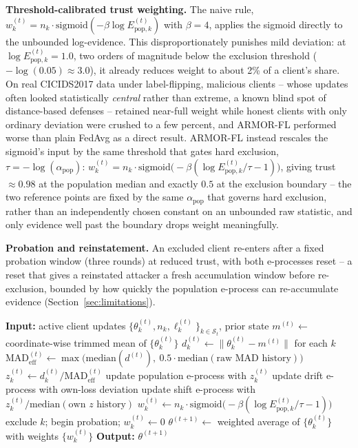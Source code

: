 \documentclass[pdflatex,iicol,sn-mathphys-num]{sn-jnl}%
\theoremstyle{thmstyleone}%
\theoremstyle{thmstyletwo}%
\theoremstyle{thmstylethree}%
\begin{document}
\textbf{Threshold-calibrated trust weighting.} The naive rule, $w_k^{(t)} = n_k \cdot \mathrm{sigmoid}(-\beta \log E_{\mathrm{pop},k}^{(t)})$ with $\beta=4$, applies the sigmoid directly to the unbounded log-evidence. This disproportionately punishes mild deviation: at $\log E_{\mathrm{pop},k}^{(t)} = 1.0$, two orders of magnitude below the exclusion threshold ($-\log(0.05) \approx 3.0$), it already reduces weight to about 2\% of a client's share. On real CICIDS2017 data under label-flipping, malicious clients -- whose updates often looked statistically \emph{central} rather than extreme, a known blind spot of distance-based defenses -- retained near-full weight while honest clients with only ordinary deviation were crushed to a few percent, and ARMOR-FL performed worse than plain FedAvg as a direct result. ARMOR-FL instead rescales the sigmoid's input by the same threshold that gates hard exclusion, $\tau = -\log(\alpha_{\mathrm{pop}})$: $w_k^{(t)} = n_k \cdot \mathrm{sigmoid}\bigl(-\beta (\log E_{\mathrm{pop},k}^{(t)} / \tau - 1)\bigr)$, giving trust $\approx 0.98$ at the population median and exactly $0.5$ at the exclusion boundary -- the two reference points are fixed by the same $\alpha_{\mathrm{pop}}$ that governs hard exclusion, rather than an independently chosen constant on an unbounded raw statistic, and only evidence well past the boundary drops weight meaningfully.

\textbf{Probation and reinstatement.} An excluded client re-enters after a fixed probation window (three rounds) at reduced trust, with both e-processes reset -- a reset that gives a reinstated attacker a fresh accumulation window before re-exclusion, bounded by how quickly the population e-process can re-accumulate evidence (Section~\ref{sec:limitations}).

\begin{algorithm}
\caption{ARMOR-FL aggregation, one round}\label{alg:armor}
\footnotesize
\begin{algorithmic}[1]
\State \textbf{Input:} active client updates $\{\theta_k^{(t)}, n_k, \ell_k^{(t)}\}_{k \in \mathcal{S}_t}$, prior state
\State $m^{(t)} \gets$ coordinate-wise trimmed mean of $\{\theta_k^{(t)}\}$
\State $d_k^{(t)} \gets \lVert \theta_k^{(t)} - m^{(t)} \rVert$ for each $k$
\State $\mathrm{MAD}^{(t)}_{\mathrm{eff}} \gets \max\bigl(\mathrm{median}(d^{(t)}),\ 0.5 \cdot \mathrm{median}(\text{raw MAD history})\bigr)$
  \State $z_k^{(t)} \gets d_k^{(t)} / \mathrm{MAD}^{(t)}_{\mathrm{eff}}$
  \State update population e-process with $z_k^{(t)}$
  \State update drift e-process with own-loss deviation
  \State update shift e-process with $z_k^{(t)} / \mathrm{median}(\text{own } z \text{ history})$
  \State $w_k^{(t)} \gets n_k \cdot \mathrm{sigmoid}\bigl(-\beta(\log E_{\mathrm{pop},k}^{(t)}/\tau - 1)\bigr)$
    \State exclude $k$; begin probation; $w_k^{(t)} \gets 0$
  \EndIf
\EndFor
\State $\theta^{(t+1)} \gets$ weighted average of $\{\theta_k^{(t)}\}$ with weights $\{w_k^{(t)}\}$
\State \textbf{Output:} $\theta^{(t+1)}$
\end{algorithmic}
\end{algorithm}
\end{document}
